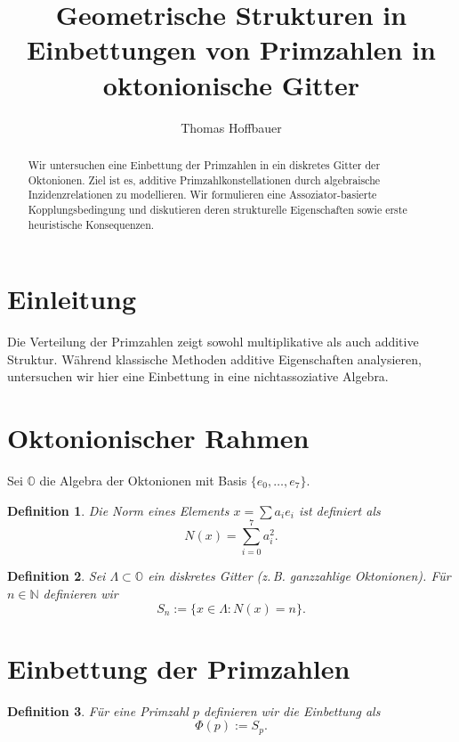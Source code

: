 \documentclass[11pt]{article}
\title{Geometrische Strukturen in Einbettungen von Primzahlen in oktonionische Gitter}
\author{Thomas Hoffbauer}
\date{}
\newtheorem{definition}{Definition}
\begin{document}
	
	\maketitle
	
	\begin{abstract}
		Wir untersuchen eine Einbettung der Primzahlen in ein diskretes Gitter der Oktonionen. Ziel ist es, additive Primzahlkonstellationen durch algebraische Inzidenzrelationen zu modellieren. Wir formulieren eine Assoziator-basierte Kopplungsbedingung und diskutieren deren strukturelle Eigenschaften sowie erste heuristische Konsequenzen.
	\end{abstract}
	
	\section{Einleitung}
	
	Die Verteilung der Primzahlen zeigt sowohl multiplikative als auch additive Struktur. Während klassische Methoden additive Eigenschaften analysieren, untersuchen wir hier eine Einbettung in eine nichtassoziative Algebra.
	
	\section{Oktonionischer Rahmen}
	
	Sei $\mathbb{O}$ die Algebra der Oktonionen mit Basis $\{e_0,\dots,e_7\}$.
	
	\begin{definition}
		Die Norm eines Elements $x=\sum a_i e_i$ ist definiert als
		\[
		N(x) = \sum_{i=0}^7 a_i^2.
		\]
	\end{definition}
	
	\begin{definition}
		Sei $\Lambda \subset \mathbb{O}$ ein diskretes Gitter (z.\,B. ganzzahlige Oktonionen). Für $n\in\mathbb{N}$ definieren wir
		\[
		S_n := \{x\in\Lambda : N(x)=n\}.
		\]
	\end{definition}
	
	\section{Einbettung der Primzahlen}
	
	\begin{definition}
		Für eine Primzahl $p$ definieren wir die Einbettung als
		\[
		\Phi(p) := S_p.
		\]
	\end{definition}
	
\end{document}
